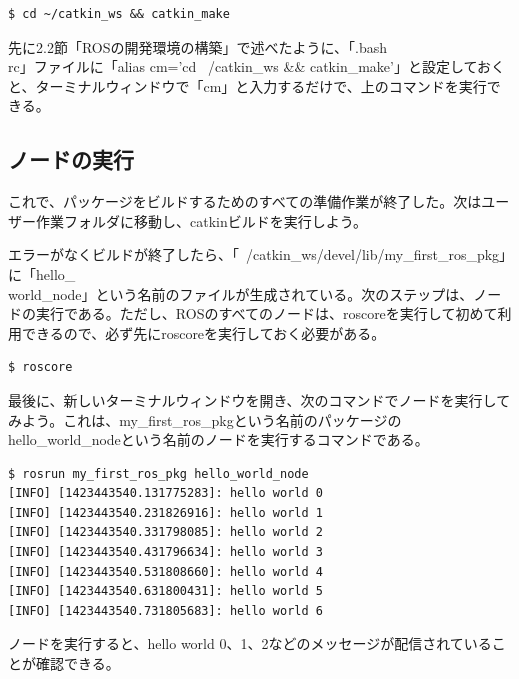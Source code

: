 \begin{lstlisting}[language=ROS]
$ cd ~/catkin_ws && catkin_make
\end{lstlisting}

\begin{exercise}[短縮コマンド]
先に2.2節「ROSの開発環境の構築」で述べたように、「.bash\\rc」ファイルに「alias cm='cd ~/catkin\_ws \&\& catkin\_make'」と設定しておくと、ターミナルウィンドウで「cm」と入力するだけで、上のコマンドを実行できる。
\end{exercise}

\subsection{ノードの実行}
これで、パッケージをビルドするためのすべての準備作業が終了した。次はユーザー作業フォルダに移動し、catkinビルドを実行しよう。

エラーがなくビルドが終了したら、「~/catkin\_ws/devel/lib/my\_first\_ros\_pkg」に「hello\_\\world\_node」という名前のファイルが生成されている。次のステップは、ノードの実行である。ただし、ROSのすべてのノードは、roscoreを実行して初めて利用できるので、必ず先にroscoreを実行しておく必要がある。

\begin{lstlisting}[language=ROS]
$ roscore
\end{lstlisting}

最後に、新しいターミナルウィンドウを開き、次のコマンドでノードを実行してみよう。これは、my\_first\_ros\_pkgという名前のパッケージのhello\_world\_nodeという名前のノードを実行するコマンドである。

\begin{lstlisting}[language=ROS]
$ rosrun my_first_ros_pkg hello_world_node
[INFO] [1423443540.131775283]: hello world 0
[INFO] [1423443540.231826916]: hello world 1
[INFO] [1423443540.331798085]: hello world 2
[INFO] [1423443540.431796634]: hello world 3
[INFO] [1423443540.531808660]: hello world 4
[INFO] [1423443540.631800431]: hello world 5
[INFO] [1423443540.731805683]: hello world 6
\end{lstlisting}

ノードを実行すると、hello world 0、1、2などのメッセージが配信されていることが確認できる。

